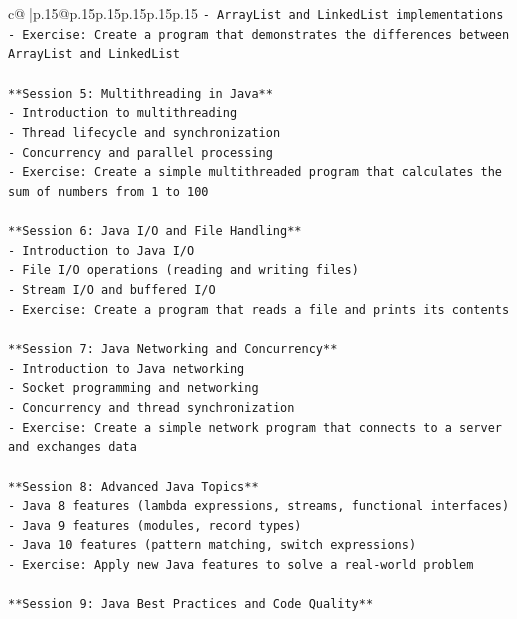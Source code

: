 \documentclass{article}
\begin{document}
{\begin{supertabular}{c@{$\;$}|p{.15\linewidth}@{}p{.15\linewidth}p{.15\linewidth}p{.15\linewidth}p{.15\linewidth}p{.15\linewidth}}
{{{\texttt{{-} ArrayList and LinkedList implementations} \\
\texttt{{-} Exercise: Create a program that demonstrates the differences between ArrayList and LinkedList} \\
\\ 
\texttt{**Session 5: Multithreading in Java**} \\
\texttt{{-} Introduction to multithreading} \\
\texttt{{-} Thread lifecycle and synchronization} \\
\texttt{{-} Concurrency and parallel processing} \\
\texttt{{-} Exercise: Create a simple multithreaded program that calculates the sum of numbers from 1 to 100} \\
\\ 
\texttt{**Session 6: Java I/O and File Handling**} \\
\texttt{{-} Introduction to Java I/O} \\
\texttt{{-} File I/O operations (reading and writing files)} \\
\texttt{{-} Stream I/O and buffered I/O} \\
\texttt{{-} Exercise: Create a program that reads a file and prints its contents} \\
\\ 
\texttt{**Session 7: Java Networking and Concurrency**} \\
\texttt{{-} Introduction to Java networking} \\
\texttt{{-} Socket programming and networking} \\
\texttt{{-} Concurrency and thread synchronization} \\
\texttt{{-} Exercise: Create a simple network program that connects to a server and exchanges data} \\
\\ 
\texttt{**Session 8: Advanced Java Topics**} \\
\texttt{{-} Java 8 features (lambda expressions, streams, functional interfaces)} \\
\texttt{{-} Java 9 features (modules, record types)} \\
\texttt{{-} Java 10 features (pattern matching, switch expressions)} \\
\texttt{{-} Exercise: Apply new Java features to solve a real{-}world problem} \\
\\ 
\texttt{**Session 9: Java Best Practices and Code Quality**} \\
}}}
\end{supertabular}}
\end{document}
